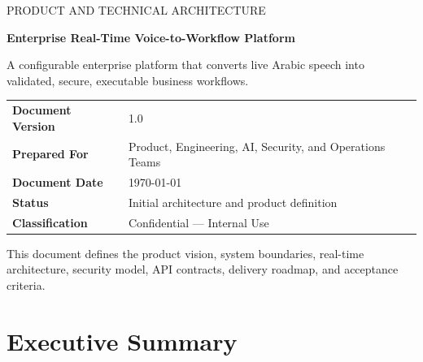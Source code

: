 \documentclass[11pt,a4paper]{article}
\newcommand{\ProjectName}{Enterprise Real-Time Voice-to-Workflow Platform}
\newcommand{\DocumentVersion}{1.0}
\newcommand{\DocumentDate}{\today}
\newcommand{\PreparedFor}{Product, Engineering, AI, Security, and Operations Teams}
\begin{document}
\begin{titlepage}
\thispagestyle{empty}

\vspace*{16mm}

{\sffamily\Large\color{Secondary}
PRODUCT AND TECHNICAL ARCHITECTURE
}

\vspace{8mm}

{\sffamily\bfseries\fontsize{27}{33}\selectfont\color{Primary}
\ProjectName
}

\vspace{5mm}

{\Large\color{TextMuted}
A configurable enterprise platform that converts live Arabic speech
into validated, secure, executable business workflows.
}

\vspace{14mm}

\begin{tcolorbox}[
colback=Surface,
colframe=Border,
boxrule=0.6pt,
arc=2mm,
left=5mm,
right=5mm,
top=4mm,
bottom=4mm
]
\begin{tabularx}{\textwidth}{L{37mm}Y}
\textbf{Document Version} & \DocumentVersion \\
\textbf{Prepared For} & \PreparedFor \\
\textbf{Document Date} & \DocumentDate \\
\textbf{Status} & Initial architecture and product definition \\
\textbf{Classification} & Confidential --- Internal Use \\
\end{tabularx}
\end{tcolorbox}

\vfill

\begin{center}
{\sffamily\small\color{TextMuted}
This document defines the product vision, system boundaries,
real-time architecture, security model, API contracts,
delivery roadmap, and acceptance criteria.
}
\end{center}
\end{titlepage}

\tableofcontents
\newpage

\section{Executive Summary}
\end{document}
